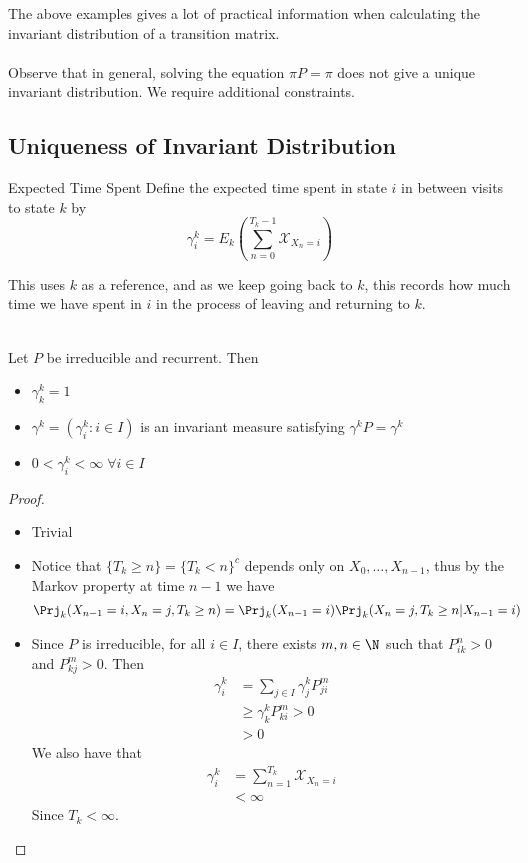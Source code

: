 \documentclass[a4paper]{article}
\begin{document}
The above examples gives a lot of practical information when calculating the invariant distribution of a transition matrix. \\~\\
Observe that in general, solving the equation $\pi P=\pi$ does not give a unique invariant distribution. We require additional constraints. 

\subsection{Uniqueness of Invariant Distribution}
\begin{defn}{Expected Time Spent}{} Define the expected time spent in state $i$ in between visits to state $k$ by $$\gamma_i^k=E_k\left(\sum_{n=0}^{T_k-1}\mathcal{X}_{X_n=i}\right)$$
\end{defn}

This uses $k$ as a reference, and as we keep going back to $k$, this records how much time we have spent in $i$ in the process of leaving and returning to $k$. \\~\\

\begin{thm}{}{} Let $P$ be irreducible and recurrent. Then
\begin{itemize}
\item $\gamma_k^k=1$
\item $\gamma^k=(\gamma_i^k:i\in I)$ is an invariant measure satisfying $\gamma^kP=\gamma^k$
\item $0<\gamma_i^k<\infty\;\forall i\in I$
\end{itemize} \tcbline
\begin{proof}~\\
\begin{itemize}
\item Trivial
\item Notice that $\{T_k\geq n\}=\{T_k<n\}^c$ depends only on $X_0,\dots,X_{n-1}$, thus by the Markov property at time $n-1$ we have 
\begin{align*}
\Prj_k(X_{n-1}=i,X_n=j,T_k\geq n)&=\Prj_k(X_{n-1}=i)\Prj_k(X_n=j,T_k\geq n|X_{n-1}=i)
\end{align*}
\item Since $P$ is irreducible, for all $i\in I$, there exists $m,n\in\N$ such that $P_{ik}^n>0$ and $P_{kj}^m>0$. Then 
\begin{align*}
\gamma_i^k&=\sum_{j\in I}\gamma_j^kP_{ji}^m\\
&\geq\gamma_k^kP_{ki}^m>0\\
&>0
\end{align*}
We also have that 
\begin{align*}
\gamma_i^k&=\sum_{n=1}^{T_k}\mathcal{X}_{X_n=i}\\
&<\infty
\end{align*}
Since $T_k<\infty$. 
\end{itemize}
\end{proof}
\end{thm}
\end{document}
